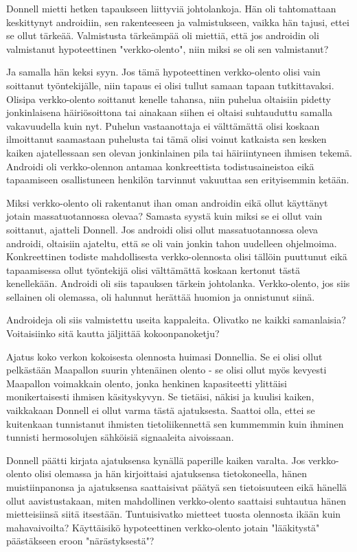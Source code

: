 Donnell mietti hetken tapaukseen liittyviä johtolankoja. Hän oli tahtomattaan keskittynyt androidiin, sen rakenteeseen ja valmistukseen, vaikka hän tajusi, ettei se ollut tärkeää. Valmistusta tärkeämpää oli miettiä, että jos androidin oli valmistanut hypoteettinen "verkko-olento", niin miksi se oli sen valmistanut?


Ja samalla hän keksi syyn. Jos tämä hypoteettinen verkko-olento olisi vain soittanut työntekijälle, niin tapaus ei olisi tullut samaan tapaan tutkittavaksi. Olisipa verkko-olento soittanut kenelle tahansa, niin puhelua oltaisiin pidetty jonkinlaisena häiriösoittona tai ainakaan siihen ei oltaisi suhtauduttu samalla vakavuudella kuin nyt. Puhelun vastaanottaja ei välttämättä olisi koskaan ilmoittanut saamastaan puhelusta tai tämä olisi voinut katkaista sen kesken kaiken ajatellessaan sen olevan jonkinlainen pila tai häiriintyneen ihmisen tekemä. Androidi oli verkko-olennon antamaa konkreettista todistusaineistoa eikä tapaamiseen osallistuneen henkilön tarvinnut vakuuttaa sen erityisemmin ketään.


Miksi verkko-olento oli rakentanut ihan oman androidin eikä ollut käyttänyt jotain massatuotannossa olevaa? Samasta syystä kuin miksi se ei ollut vain soittanut, ajatteli Donnell. Jos androidi olisi ollut massatuotannossa oleva androidi, oltaisiin ajateltu, että se oli vain jonkin tahon uudelleen ohjelmoima. Konkreettinen todiste mahdollisesta verkko-olennosta olisi tällöin puuttunut eikä tapaamisessa ollut työntekijä olisi välttämättä koskaan kertonut tästä kenellekään. Androidi oli siis tapauksen tärkein johtolanka. Verkko-olento, jos siis sellainen oli olemassa, oli halunnut herättää huomion ja onnistunut siinä.


Androideja oli siis valmistettu useita kappaleita. Olivatko ne kaikki samanlaisia? Voitaisiinko sitä kautta jäljittää kokoonpanoketju?




\psep Ajatus koko verkon kokoisesta olennosta huimasi Donnellia. Se ei olisi ollut pelkästään Maapallon suurin yhtenäinen olento - se olisi ollut myös kevyesti Maapallon voimakkain olento, jonka henkinen kapasiteetti ylittäisi monikertaisesti ihmisen käsityskyvyn. Se tietäisi, näkisi ja kuulisi kaiken, vaikkakaan Donnell ei ollut varma tästä ajatuksesta. Saattoi olla, ettei se kuitenkaan tunnistanut ihmisten tietoliikennettä sen kummemmin kuin ihminen tunnisti hermosolujen sähköisiä signaaleita aivoissaan.


Donnell päätti kirjata ajatuksensa kynällä paperille kaiken varalta. Jos verkko-olento olisi olemassa ja hän kirjoittaisi ajatuksensa tietokoneella, hänen muistiinpanonsa ja ajatuksensa saattaisivat päätyä sen tietoisuuteen eikä hänellä ollut aavistustakaan, miten mahdollinen verkko-olento saattaisi suhtautua hänen mietteisiinsä siitä itsestään. Tuntuisivatko mietteet tuosta olennosta ikään kuin mahavaivoilta? Käyttäisikö hypoteettinen verkko-olento jotain "lääkitystä" päästäkseen eroon "närästyksestä"?


